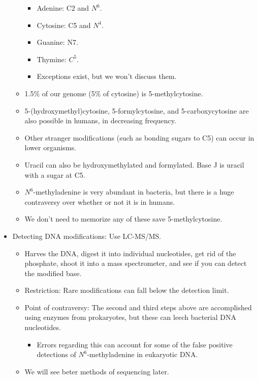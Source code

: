 \documentclass[../notes.tex]{subfiles}
\begin{document}
\begin{itemize}
\begin{itemize}
        \begin{itemize}
            \item Adenine: C2 and $N^6$.
            \item Cytosine: C5 and $N^4$.
            \item Guanine: N7.
            \item Thymine: $C^5$.
            \item Exceptions exist, but we won't discuss them.
        \end{itemize}
        \item 1.5\% of our genome (5\% of cytosine) is 5-methylcytosine.
        \item 5-(hydroxymethyl)cytosine, 5-formylcytosine, and 5-carboxycytosine are also possible in humans, in decreasing frequency.
        \item Other stranger modifications (such as bonding sugars to C5) can occur in lower organisms.
        \item Uracil can also be hydroxymethylated and formylated. Base J is uracil with a sugar at C5.
        \item $N^6$-methyladenine is very abundant in bacteria, but there is a huge contraversy over whether or not it is in humans.
        \item We don't need to memorize any of these save 5-methylcytosine.
    \end{itemize}
    \item Detecting DNA modifications: Use LC-MS/MS.
    \begin{itemize}
        \item Harves the DNA, digest it into individual nucleotides, get rid of the phosphate, shoot it into a mass spectrometer, and see if you can detect the modified base.
        \item Restriction: Rare modifications can fall below the detection limit.
        \item Point of contraversy: The second and third steps above are accomplished using enzymes from prokaryotes, but these can leech bacterial DNA nucleotides.
        \begin{itemize}
            \item Errors regarding this can account for some of the false positive detections of $N^6$-methyladenine in eukaryotic DNA.
        \end{itemize}
        \item We will see beter methods of sequencing later.
    \end{itemize}

\end{itemize}
\end{document}
